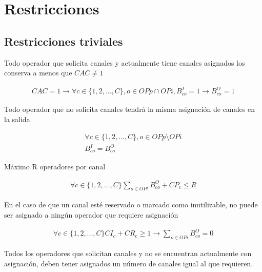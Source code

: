 \section{Restricciones}

\subsection{Restricciones triviales}


Todo operador que solicita canales y actualmente tiene canales asignados los conserva a menos que $CAC \neq 1$

\begin{equation}
	\begin{array}{cc}
		CAC = 1 \to \forall c \in \{1,2,...,C\} ,o \in OPp \cap OPi, B^{I}_{co} = 1 \to  B^{O}_{co} = 1
	\end{array}
\end{equation}

Todo operador que no solicita canales tendrá la misma asignación de canales en la salida

\begin{equation}
	\begin{array}{cc}
		\forall c \in \{1,2,...,C\} , o \in OPp \setminus OPi\\
		B^{I}_{co} = B^{O}_{co}
	\end{array}
\end{equation}

Máximo R operadores por canal

\begin{equation}
	\begin{array}{cc}
		\forall c \in \{1,2,...,C\}  \sum \limits_{o \in OPt} B^{O}_{co} + CP_{c} \leq R
	\end{array}
\end{equation}

En el caso de que un canal esté reservado o marcado como inutilizable, no puede ser asignado a ningún operador que requiere asignación

\begin{equation}
	\begin{array}{cc}
		\forall c \in \{1,2,...,C\} CI_{c} + CR_{c} \geq 1 \to \sum \limits_{o \in OPi} B^{O}_{co} = 0
	\end{array}
\end{equation}

Todos los operadores que solicitan canales y no se encuentran actualmente con asignación, deben tener asignados un número de canales igual al que requieren.

